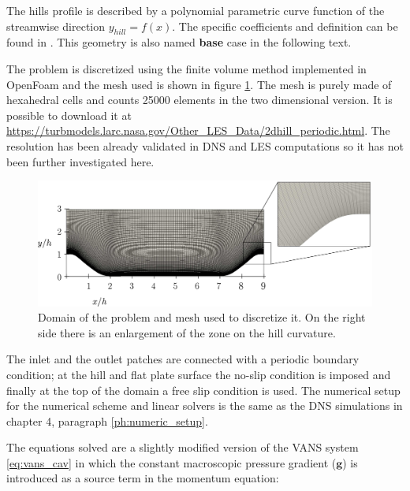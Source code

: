 The hills profile is described by a polynomial parametric curve function of the streamwise direction $y_{hill} = f(x)$. The specific coefficients and definition can be found in \citet{almeida1993wake}. This geometry is also named \textbf{base} case in the following text.

The problem is discretized using the finite volume method implemented in OpenFoam and the mesh used is shown in figure \ref{fig:mesh_hill}. The mesh is purely made of hexahedral cells and counts 25000 elements in the two dimensional version. It is possible to download it at \url{https://turbmodels.larc.nasa.gov/Other_LES_Data/2dhill_periodic.html}. The resolution has been already validated in DNS and LES computations so it has not been further investigated here.

\begin{figure}[H]
	\centering
	\includegraphics[width=1\linewidth]{chapter_5/figure/mesh}
	\caption{Domain of the problem and mesh used to discretize it. On the right side there is an enlargement of the zone on the hill curvature.}
	\label{fig:mesh_hill}
\end{figure}

The inlet and the outlet patches are connected with a periodic boundary condition; at the hill and flat plate surface the no-slip condition is imposed and finally at the top of the domain a free slip condition is used.
The numerical setup for the numerical scheme and linear solvers is the same as the DNS simulations in chapter 4, paragraph \ref{ph:numeric_setup}.

The equations solved are a slightly modified version of the VANS system \eqref{eq:vans_cav} in which the constant macroscopic pressure gradient ($\mathbf{g}$) is introduced as a source term in the momentum equation:

